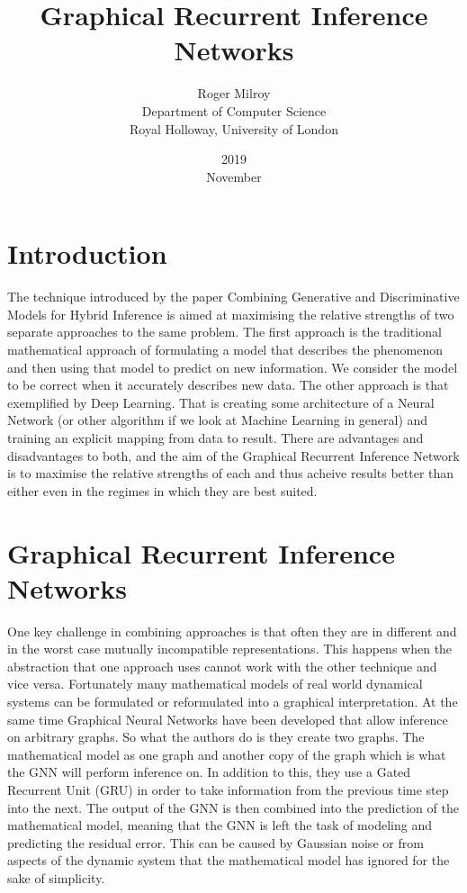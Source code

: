 \documentclass[]{article}
\begin{document}
\title{Graphical Recurrent Inference Networks}
\date{2019\\ November}
\author{Roger Milroy\\ Department of Computer Science\\ Royal Holloway, University of London}

\maketitle

\section{Introduction}

The technique introduced by the paper Combining Generative and Discriminative Models for Hybrid Inference \cite{HybridInference} is aimed at maximising the relative strengths of two separate approaches to the same problem.
The first approach is the traditional mathematical approach of formulating a model that describes the phenomenon and then using that model to predict on new information. We consider the model to be correct when it accurately describes new data.
The other approach is that exemplified by Deep Learning. That is creating some architecture of a Neural Network (or other algorithm if we look at Machine Learning in general) and training an explicit mapping from data to result.
There are advantages and disadvantages to both, and the aim of the Graphical Recurrent Inference Network is to maximise the relative strengths of each and thus acheive results better than either even in the regimes in which they are best suited.


\section{Graphical Recurrent Inference Networks}

One key challenge in combining approaches is that often they are in different and in the worst case mutually incompatible representations. This happens when the abstraction that one approach uses cannot work with the other technique and vice versa.
Fortunately many mathematical models of real world dynamical systems can be formulated or reformulated into a graphical interpretation. At the same time Graphical Neural Networks have been developed that allow inference on arbitrary graphs.
So what the authors do is they create two graphs. The mathematical model as one graph and another copy of the graph which is what the GNN will perform inference on. In addition to this, they use a Gated Recurrent Unit (GRU) in order to take information from the previous time step into the next.
The output of the GNN is then combined into the prediction of the mathematical model, meaning that the GNN is left the task of modeling and predicting the residual error. This can be caused by Gaussian noise or from aspects of the dynamic system that the mathematical model has ignored for the sake of simplicity.
\end{document}
